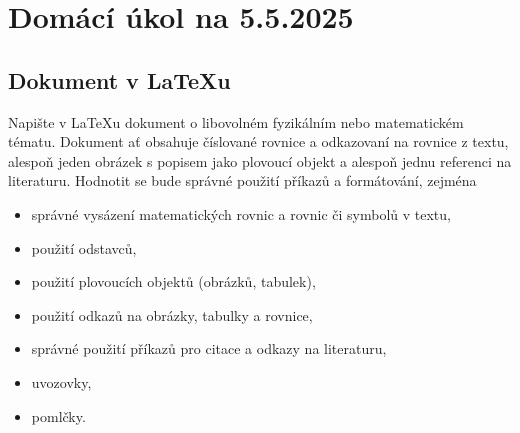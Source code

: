 \documentclass[a4paper,11pt,twoside]{article}
\begin{document}
\section*{Domácí úkol na 5.5.2025}
\subsection*{Dokument v \LaTeX{}u}

Napište v \LaTeX{}u dokument o libovolném fyzikálním nebo matematickém tématu.
Dokument ať obsahuje číslované rovnice a odkazovaní na rovnice z textu, alespoň jeden obrázek s popisem jako plovoucí objekt a alespoň jednu referenci na literaturu.
Hodnotit se bude správné použití příkazů a formátování, zejména
\begin{itemize}
    \item správné vysázení matematických rovnic a rovnic či symbolů v textu,
    \item použití odstavců,
    \item použití plovoucích objektů (obrázků, tabulek),
    \item použití odkazů na obrázky, tabulky a rovnice,
    \item správné použití příkazů pro citace a odkazy na literaturu,
    \item uvozovky,
    \item pomlčky.
\end{itemize}
\end{document}
